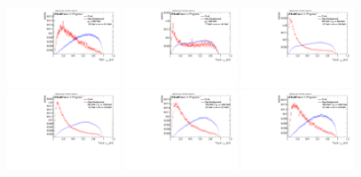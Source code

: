 \begin{figure}
\includegraphics[width=0.3\textwidth]{sascha_input/Appendix/Distributions/top/distributions/beta2/h_assisted_tj_nSub32_2_bin6.pdf} 
\bigskip
\includegraphics[width=0.3\textwidth]{sascha_input/Appendix/Distributions/top/distributions/beta2/h_normal_tj_nSub32_2_bin1.pdf} \hspace{1mm}
\includegraphics[width=0.3\textwidth]{sascha_input/Appendix/Distributions/top/distributions/beta2/h_normal_tj_nSub32_2_bin2.pdf} \hspace{1mm}
\includegraphics[width=0.3\textwidth]{sascha_input/Appendix/Distributions/top/distributions/beta2/h_normal_tj_nSub32_2_bin3.pdf} 
\bigskip
\includegraphics[width=0.3\textwidth]{sascha_input/Appendix/Distributions/top/distributions/beta2/h_normal_tj_nSub32_2_bin4.pdf} \hspace{1mm}
\includegraphics[width=0.3\textwidth]{sascha_input/Appendix/Distributions/top/distributions/beta2/h_normal_tj_nSub32_2_bin5.pdf} \hspace{1mm}

\end{figure}
